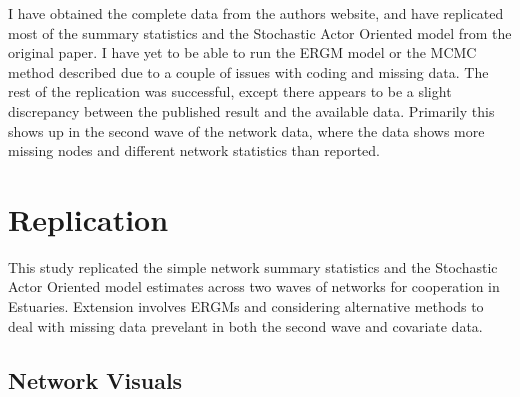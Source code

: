 \documentclass[12pt]{article} %
\numberwithin{equation}{section}		%
\numberwithin{figure}{section}			%
\numberwithin{table}{section}				%
\begin{document}
I have obtained the complete data from the authors website, and have replicated most of the summary statistics and the Stochastic Actor Oriented model from the original paper. I have yet to be able to run the ERGM model or the MCMC method described due to a couple of issues with coding and missing data. The rest of the replication was successful, except there appears to be a slight discrepancy between the published result and the available data. Primarily this shows up in the second wave of the network data, where the data shows more missing nodes and different network statistics than reported.

\section{Replication}
This study replicated the simple network summary statistics and the Stochastic Actor Oriented model estimates across two waves of networks for cooperation in Estuaries. Extension involves ERGMs and considering alternative methods to deal with missing data prevelant in both the second wave and covariate data.

\subsection{Network Visuals}
\end{document}
